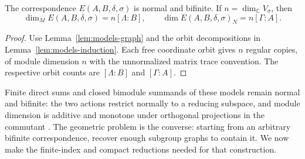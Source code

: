\begin{corollary}\label{cor:models-dimensions}
The correspondence $E(A,B,\delta,\sigma)$ is normal and bifinite. If
$n=\dim_{\mathbb C}V_\sigma$, then
\[
 \dim_M E(A,B,\delta,\sigma)=n[\Lambda:B],\qquad
 \dim E(A,B,\delta,\sigma)_N=n[\Gamma:A].
\]
\end{corollary}
\begin{proof}
Use Lemma~\ref{lem:models-graph} and the orbit decompositions in
Lemma~\ref{lem:models-induction}. Each free coordinate orbit gives $n$
regular copies, of module dimension $n$ with the unnormalized matrix
trace convention. The respective orbit counts are $[\Lambda:B]$ and
$[\Gamma:A]$.
\end{proof}

Finite direct sums and closed bimodule summands of these models remain
normal and bifinite: the two actions restrict normally to a reducing
subspace, and module dimension is additive and monotone under orthogonal
projections in the commutant
\cite[Theorem~10.2.1]{Jones2009}. The geometric problem is the converse:
starting from an arbitrary bifinite correspondence, recover enough
subgroup graphs to contain it. We now make the finite-index and compact
reductions needed for that construction.
